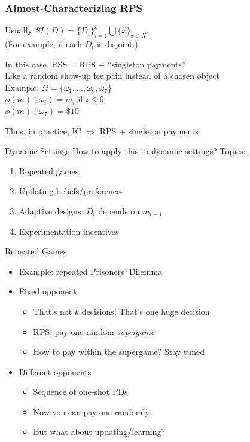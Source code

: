 \begin{frame}
  \frametitle{Almost-Characterizing RPS}
  Usually $SI(D) = \{D_i\}_{i=1}^k \bigcup \{x\}_{x\in X}$.\\
  (For example, if each $D_i$ is disjoint.)

  \bigskip

  In this case, RSS = RPS + ``singleton payments''\\
  Like a random show-up fee paid instead of a chosen object\\
  Example: $\Omega=\{\omega_1,\ldots,\omega_6,\omega_7\}$\\
  $\phi(m)(\omega_i)=m_i$ if $i\leq 6$\\
  $\phi(m)(\omega_7)=\$10$

  \bigskip

  Thus, in practice, IC $\iff$ RPS + singleton payments
\end{frame}


\begin{frame}{Dynamic Settings}
How to apply this to dynamic settings? Topics:
\begin{enumerate}
    \item Repeated games
    \item Updating beliefs/preferences
    \item Adaptive designs: $D_i$ depends on $m_{i-1}$
    \item Experimentation incentives
\end{enumerate}
\end{frame}

\begin{frame}{Repeated Games}
\begin{itemize}
    \item Example: repeated Prisoners' Dilemma
    \item Fixed opponent
    \begin{itemize}
        \item That's not $k$ decisions! That's one huge decision
        \item RPS: pay one random \textit{supergame}
        \item How to pay within the supergame? Stay tuned
    \end{itemize}
    \item Different opponents
    \begin{itemize}
        \item Sequence of one-shot PDs
        \item Now you can pay one randomly
        \item But what about updating/learning?
    \end{itemize}
\end{itemize}
\end{frame}

